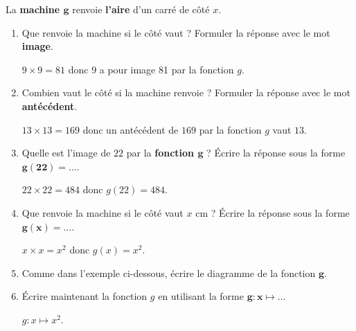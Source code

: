 \begin{corrige}
    La \textbf{machine $\boldsymbol{g}$} renvoie \textbf{l'aire} d'un carré de côté $x$.

    \hspace*{-13mm}
    
    \begin{enumerate}
        \item Que renvoie la machine si le côté vaut   ? Formuler la réponse avec le mot \textbf{image}.
        
        {\red $9\times 9 = 81$ donc $9$ a pour image 81 par la fonction $g$.}
        \item Combien vaut le côté si la machine renvoie   ? Formuler la réponse avec le mot \textbf{antécédent}.
        
        {\red $13\times 13 = 169$ donc un antécédent de $169$ par la fonction $g$ vaut $13$.}
        \item Quelle est l'image de $22$ par la \textbf{fonction $\boldsymbol{g}$} ? Écrire la réponse sous la forme $\boldsymbol{g(22)=\ldots}$.
        
        {\red $22\times 22 = 484$ donc $g(22)=484$.}
        \item Que renvoie la machine si le côté vaut $x$ cm ? Écrire la réponse sous la forme $\boldsymbol{g(x)=\ldots}$.
        
        {\red $x\times x = x^2$ donc $g(x)=x^2$.}
        \item Comme dans l'exemple ci-dessous, écrire le diagramme de la fonction $\boldsymbol{g}$.
        \medskip
        \medskip
        \item Écrire maintenant la fonction $g$ en utilisant la forme $\boldsymbol{g:x} \longmapsto \ldots$
        
        {\red $g : x \longmapsto x^2$.}
    \end{enumerate}
\end{corrige}
